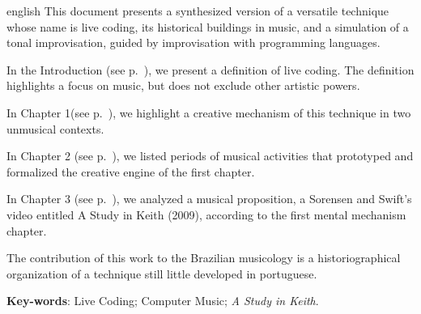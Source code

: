 \begin{resumo}[Abstract]
 \begin{otherlanguage*}{english}
	This document presents a synthesized version of a versatile technique whose name is live coding, its historical buildings in music, and a   simulation of a tonal improvisation, guided by improvisation with programming languages.
	
In the Introduction (see p.~\pageref{cap:intro}), we present a definition of live coding. The definition highlights
a focus on music, but does not exclude other artistic powers.

In Chapter 1(see p.~\pageref{cap:introducao}), we highlight a creative mechanism of this technique in two unmusical contexts.

In Chapter 2 (see p.~\pageref{cap:protohistoria}), we listed periods of musical activities that prototyped and formalized the creative engine of the first chapter.

In Chapter 3 (see p.~\pageref{cap:estudos_de_caso}), we analyzed a musical proposition, a Sorensen and Swift's video entitled A Study in Keith (2009), according to the first mental mechanism chapter.

The contribution of this work to the Brazilian musicology is a historiographical organization of a technique still little developed in portuguese.
   \vspace{\onelineskip}
 
   \noindent 
   \textbf{Key-words}: Live Coding; Computer Music; \emph{A Study in Keith}.
 \end{otherlanguage*}
\end{resumo}

\begin{comment}

\begin{resumo}[Résumé]
 \begi'n{otherlanguage*}{french}
    Il s'agit d'un résumé en français.
 
   \textbf{Mots-clés}: latex. abntex. publication de textes.
 \end{otherlanguage*}
\end{resumo}

\begin{resumo}[Resumen]
 \begin{otherlanguage*}{spanish}
   Este es el resumen en español.
  
   \textbf{Palabras clave}: latex. abntex. publicación de textos.
 \end{otherlanguage*}
\end{resumo}
\end{comment}